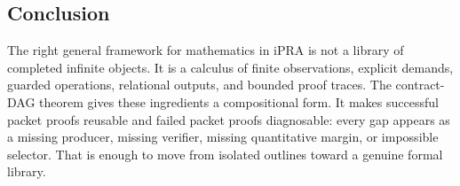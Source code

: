 \subsection{Conclusion}

The right general framework for mathematics in iPRA is not a library of
completed infinite objects.  It is a calculus of finite observations,
explicit demands, guarded operations, relational outputs, and bounded proof
traces.  The contract-DAG theorem gives these ingredients a compositional
form.  It makes successful packet proofs reusable and failed packet proofs
diagnosable: every gap appears as a missing producer, missing verifier,
missing quantitative margin, or impossible selector.  That is enough to move
from isolated outlines toward a genuine formal library.
